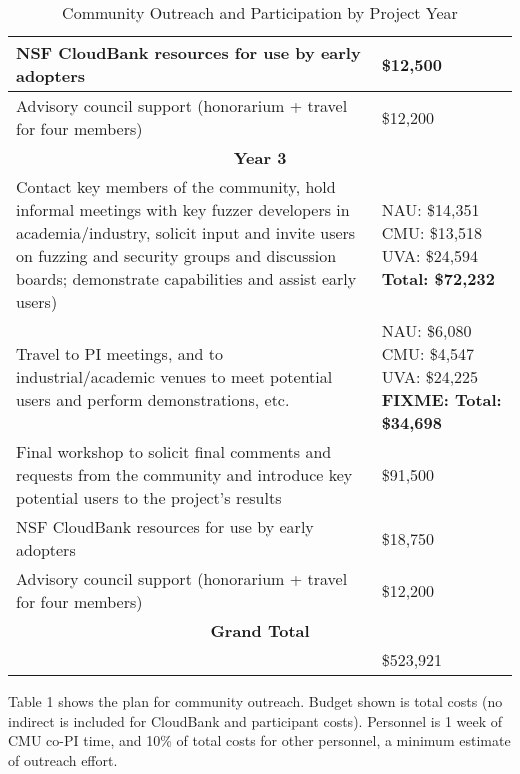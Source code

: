 \documentclass[12pt]{article}
\begin{document}
\begin{table}
\begin{tabular}{|p{12cm}|p{3cm}|}
    \hline
    NSF CloudBank resources for use by early adopters & \$12,500 \\
    \hline 
    Advisory council support (honorarium + travel for four members) & \$12,200 \\    
    \hline
    \hline
    \multicolumn{2}{c}{{\bf Year 3}} \\
    \hline
    \hline
   Contact key members of the community, hold informal meetings with
    key fuzzer developers in academia/industry, solicit input and
    invite users
    on fuzzing and security groups and discussion boards; demonstrate
    capabilities and assist early users) &  NAU:  \$14,351 CMU: \$13,518 UVA: \$24,594
                                                      \textbf{Total: \$72,232} \\
    \hline
    Travel to PI meetings, and to industrial/academic venues to meet
    potential users and perform demonstrations, etc. & NAU: \$6,080 CMU: \$4,547 UVA:  \$24,225 \textbf{FIXME: Total: \$34,698}\\
    \hline    
    Final workshop to solicit final comments and requests from the
    community and introduce key potential users to the project’s
    results & \$91,500 \\
    \hline
    NSF CloudBank resources for use by early adopters & \$18,750 \\
    \hline 
    Advisory council support (honorarium + travel for four members) & \$12,200 \\    
    \hline
    \hline
    \multicolumn{2}{c}{{\bf Grand Total}} \\
    \hline
                   &     \$523,921 \\
                     \hline
 
  \end{tabular}
\label{outreach}
  \caption{Community Outreach and Participation by Project Year}
  
\end{table}


Table 1 shows the plan for community
outreach.   Budget shown is total costs 
 (no indirect is included for CloudBank and participant costs).   Personnel is 1 week of CMU co-PI time, and 10\%
of total costs for other personnel, a
minimum estimate of outreach effort.
\end{document}
